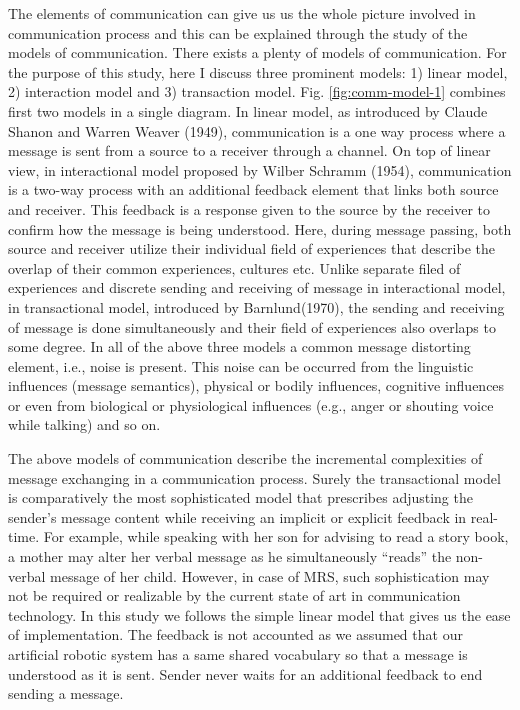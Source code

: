 The elements of communication can give us us the whole picture involved in communication process and this can be explained through the study of the models  of communication. There exists a plenty of models of communication. For the purpose of this study, here I  discuss three prominent models: 1) linear model, 2) interaction model and 3) transaction model.  
Fig. \ref{fig:comm-model-1} combines first two models in a single diagram. In linear model, as introduced by Claude Shanon and Warren Weaver (1949), communication is a one way process where a message is sent from a source to a receiver through a channel. On top of linear view, in interactional model proposed by Wilber Schramm (1954), communication is a two-way process with an additional feedback element  that links both source and receiver. This feedback is a response given to the source by the receiver to confirm how the message is being understood. Here, during message passing, both source and receiver utilize their individual field of experiences that describe the overlap of their common experiences, cultures etc. Unlike separate filed of experiences and discrete sending and receiving of message in interactional model, in transactional model, introduced by Barnlund(1970), the sending and receiving of message is done simultaneously and their  field of experiences also overlaps to some degree. In all of the above three models a common message distorting element, i.e., noise is present. This noise can be occurred from the linguistic influences (message semantics),  physical or bodily influences, cognitive influences or even from biological
or physiological influences (e.g., anger or shouting voice while talking) and so on.   

The above models of communication describe the incremental complexities of message exchanging in a communication process. Surely the transactional model is comparatively the most sophisticated model that prescribes adjusting the sender's message content while receiving an implicit or explicit feedback in real-time. For example, while speaking with her son for advising to read a story book, a mother may alter her verbal message as he simultaneously ``reads'' the non-verbal message of her child. However, in case of MRS, such sophistication may not be required or realizable by the current state of art in communication technology. In this study we follows the simple linear model that gives us the ease of implementation. The feedback is not accounted as we assumed that our artificial robotic system has a same shared vocabulary so that a message is understood as it is sent. Sender never waits for an additional feedback to end sending a message. 


